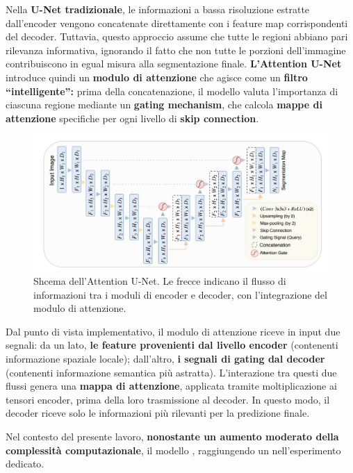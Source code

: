 Nella \textbf{U-Net tradizionale}, le informazioni a bassa risoluzione estratte dall’encoder vengono concatenate direttamente con i feature map corrispondenti del decoder. Tuttavia, questo approccio assume che tutte le regioni abbiano pari rilevanza informativa, ignorando il fatto che non tutte le porzioni dell’immagine contribuiscono in egual misura alla segmentazione finale. \textbf{L’Attention U-Net} introduce quindi un \textbf{modulo di attenzione} che agisce come un \textbf{filtro “intelligente”:} prima della concatenazione, il modello valuta l’importanza di ciascuna regione mediante un \textbf{gating mechanism}, che calcola \textbf{mappe di attenzione} specifiche per ogni livello di \textbf{skip connection}.

\begin{figure}[H] 
  	\centering 
 	\includegraphics[width=.8\textwidth]{images/2025-07-22-14-33-52.png} 
    \caption{Shcema dell’Attention U-Net. Le frecce indicano il flusso di informazioni tra i moduli di encoder e decoder, con l’integrazione del modulo di attenzione.}
    \label{fig:attention_unet}
 \end{figure} 
Dal punto di vista implementativo, il modulo di attenzione riceve in input due segnali: da un lato, \textbf{le feature provenienti dal livello encoder} (contenenti informazione spaziale locale); dall’altro, \textbf{i segnali di gating dal decoder} (contenenti informazione semantica più astratta). L’interazione tra questi due flussi genera una \textbf{mappa di attenzione}, applicata tramite moltiplicazione ai tensori encoder, prima della loro trasmissione al decoder. In questo modo, il decoder riceve solo le informazioni più rilevanti per la predizione finale.

Nel contesto del presente lavoro, \textbf{nonostante un aumento moderato della complessità computazionale}, il modello , raggiungendo un  nell’esperimento dedicato.


